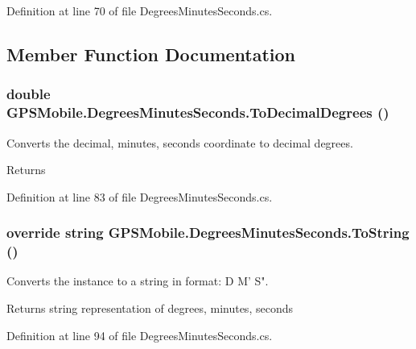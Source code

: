 Definition at line 70 of file DegreesMinutesSeconds.cs.

\subsection{Member Function Documentation}
\hypertarget{class_g_p_s_mobile_1_1_degrees_minutes_seconds_a114de0a66d178c5af760e29119d1c725}{
\subsubsection[{ToDecimalDegrees}]{\setlength{\rightskip}{0pt plus 5cm}double GPSMobile.DegreesMinutesSeconds.ToDecimalDegrees ()}}
\label{class_g_p_s_mobile_1_1_degrees_minutes_seconds_a114de0a66d178c5af760e29119d1c725}


Converts the decimal, minutes, seconds coordinate to decimal degrees. \begin{DoxyReturn}{Returns}

\end{DoxyReturn}


Definition at line 83 of file DegreesMinutesSeconds.cs.\hypertarget{class_g_p_s_mobile_1_1_degrees_minutes_seconds_a164a4704ff73cbeb937d43aded782c99}{
\subsubsection[{ToString}]{\setlength{\rightskip}{0pt plus 5cm}override string GPSMobile.DegreesMinutesSeconds.ToString ()}}
\label{class_g_p_s_mobile_1_1_degrees_minutes_seconds_a164a4704ff73cbeb937d43aded782c99}


Converts the instance to a string in format: D M' S". \begin{DoxyReturn}{Returns}
string representation of degrees, minutes, seconds
\end{DoxyReturn}


Definition at line 94 of file DegreesMinutesSeconds.cs.

